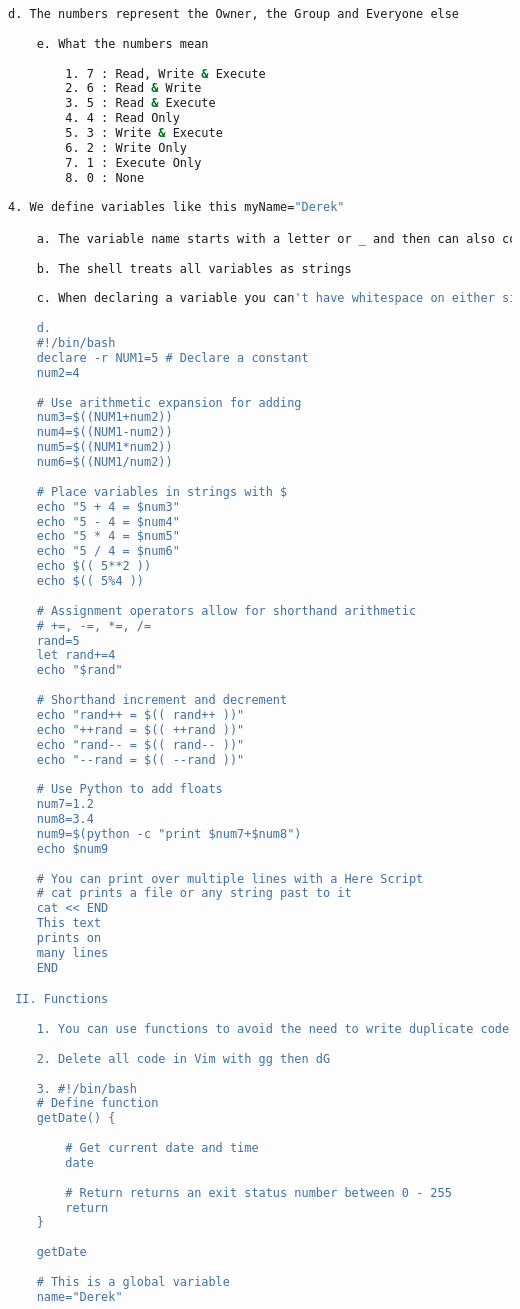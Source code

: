 \begin{lstlisting}[language=bash,caption={basics of bash}]
	d. The numbers represent the Owner, the Group and Everyone else
	
	e. What the numbers mean
	
		1. 7 : Read, Write & Execute
		2. 6 : Read & Write
		3. 5 : Read & Execute
		4. 4 : Read Only
		5. 3 : Write & Execute
		6. 2 : Write Only
		7. 1 : Execute Only
		8. 0 : None
		
4. We define variables like this myName="Derek"

	a. The variable name starts with a letter or _ and then can also contain numbers
	
	b. The shell treats all variables as strings
	
	c. When declaring a variable you can't have whitespace on either side of the =
	
	d. 
	#!/bin/bash
	declare -r NUM1=5 # Declare a constant
	num2=4
	
	# Use arithmetic expansion for adding
	num3=$((NUM1+num2))
	num4=$((NUM1-num2))
	num5=$((NUM1*num2))
	num6=$((NUM1/num2))
	
	# Place variables in strings with $
	echo "5 + 4 = $num3"
	echo "5 - 4 = $num4"
	echo "5 * 4 = $num5"
	echo "5 / 4 = $num6"
	echo $(( 5**2 ))
	echo $(( 5%4 ))
	
	# Assignment operators allow for shorthand arithmetic 
	# +=, -=, *=, /=
	rand=5
	let rand+=4
	echo "$rand"
	
	# Shorthand increment and decrement
	echo "rand++ = $(( rand++ ))"
	echo "++rand = $(( ++rand ))"
	echo "rand-- = $(( rand-- ))"
	echo "--rand = $(( --rand ))"
	
	# Use Python to add floats
	num7=1.2
	num8=3.4
	num9=$(python -c "print $num7+$num8")
	echo $num9
	
	# You can print over multiple lines with a Here Script
	# cat prints a file or any string past to it
	cat << END
	This text
	prints on
	many lines
	END

 II. Functions
 
 	1. You can use functions to avoid the need to write duplicate code
 	
 	2. Delete all code in Vim with gg then dG
 	
 	3. #!/bin/bash
 	# Define function
 	getDate() {
 		
 		# Get current date and time
 		date
 		
 		# Return returns an exit status number between 0 - 255
 		return
 	}
 	
 	getDate
 	
 	# This is a global variable
 	name="Derek"
 	

\end{lstlisting}
